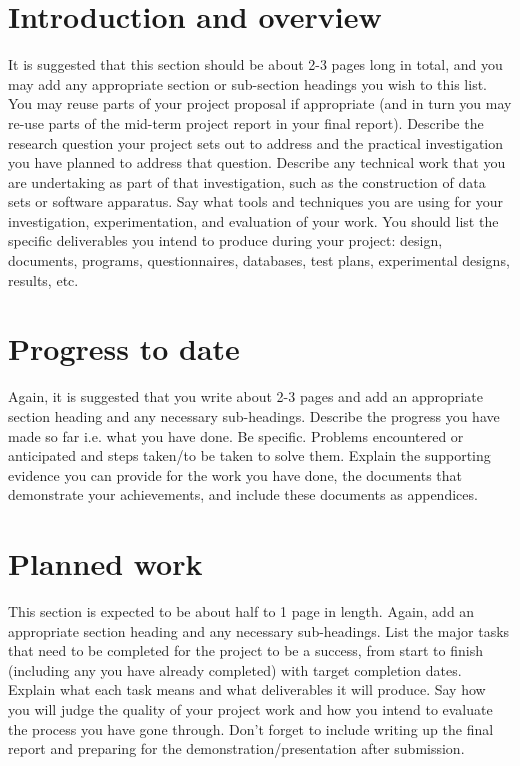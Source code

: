 \documentclass[a4paper, notitlepage, 11pt]{article}
\begin{document}


\setcounter{tocdepth}{1}
\tableofcontents

\section{Introduction and overview}

It is suggested that this section should be about 2-3 pages long in total, and you may add any appropriate section or sub-section headings you wish to this list. You may reuse parts of your project proposal if appropriate (and in turn you may re-use parts of the mid-term project report in your final report). Describe the research question your project sets out to address and the practical investigation you have planned to address that question. Describe any technical work that you are undertaking as part of that investigation, such as the construction of data sets or software apparatus. Say what tools and techniques you are using for your investigation, experimentation, and evaluation of your work. You should list the specific deliverables you intend to produce during your project: design, documents, programs, questionnaires, databases, test plans, experimental designs, results, etc.

\section{Progress to date}

Again, it is suggested that you write about 2-3 pages and add an appropriate section heading and any necessary sub-headings. Describe the progress you have made so far i.e. what you have done. Be specific. Problems encountered or anticipated and steps taken/to be taken to solve them. Explain the supporting evidence you can provide for the work you have done, the documents that demonstrate your achievements, and include these documents as appendices.

\section{Planned work}

This section is expected to be about half to 1 page in length. Again, add an appropriate section heading and any necessary sub-headings. List the major tasks that need to be completed for the project to be a success, from start to finish (including any you have already completed) with target completion dates. Explain what each task means and what deliverables it will produce. Say how you will judge the quality of your project work and how you intend to evaluate the process you have gone through. Don't forget to include writing up the final report and preparing for the demonstration/presentation after submission.
\end{document}
